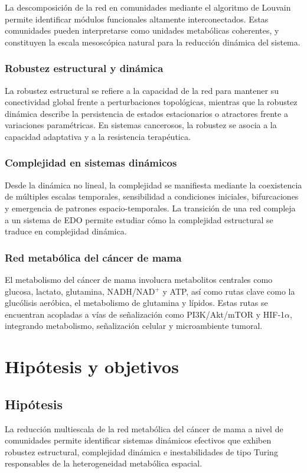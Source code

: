 \documentclass[12pt,spanish]{report}
\begin{document}
	La descomposición de la red en comunidades mediante el algoritmo de Louvain permite identificar módulos funcionales altamente interconectados. Estas comunidades pueden interpretarse como unidades metabólicas coherentes, y constituyen la escala mesoscópica natural para la reducción dinámica del sistema.
	
	\subsection{Robustez estructural y dinámica}
	
	La robustez estructural se refiere a la capacidad de la red para mantener su conectividad global frente a perturbaciones topológicas, mientras que la robustez dinámica describe la persistencia de estados estacionarios o atractores frente a variaciones paramétricas. En sistemas cancerosos, la robustez se asocia a la capacidad adaptativa y a la resistencia terapéutica.
	
	\subsection{Complejidad en sistemas dinámicos}
	
	Desde la dinámica no lineal, la complejidad se manifiesta mediante la coexistencia de múltiples escalas temporales, sensibilidad a condiciones iniciales, bifurcaciones y emergencia de patrones espacio-temporales. La transición de una red compleja a un sistema de EDO permite estudiar cómo la complejidad estructural se traduce en complejidad dinámica.
	
	\subsection{Red metabólica del cáncer de mama}
	
	El metabolismo del cáncer de mama involucra metabolitos centrales como glucosa, lactato, glutamina, NADH/NAD$^+$ y ATP, así como rutas clave como la glucólisis aeróbica, el metabolismo de glutamina y lípidos. Estas rutas se encuentran acopladas a vías de señalización como PI3K/Akt/mTOR y HIF-1$\alpha$, integrando metabolismo, señalización celular y microambiente tumoral.
	
	\chapter{Hipótesis y objetivos}
	
	\section{Hipótesis}
	La reducción multiescala de la red metabólica del cáncer de mama a nivel de comunidades permite identificar sistemas dinámicos efectivos que exhiben robustez estructural, complejidad dinámica e inestabilidades de tipo Turing responsables de la heterogeneidad metabólica espacial.
	
\end{document}
